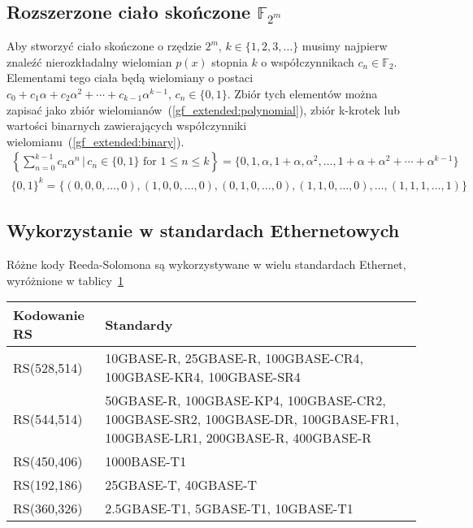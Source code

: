 \subsection{Rozszerzone ciało skończone $\mathbb{F}_{2^m}$}

Aby stworzyć ciało skończone o rzędzie $2^m$, $k \in \{ 1, 2, 3, \ldots \}$ musimy
najpierw znaleźć nierozkładalny wielomian $p(x)$ stopnia $k$ o współczynnikach
$c_{n} \in \mathbb{F}_{2}$.
Elementami tego ciała będą wielomiany o postaci $c_{0} + c_{1}\alpha + c_{2}\alpha^{2} +
    \cdots + c_{k-1}\alpha^{k-1}$, $c_{n} \in \{0, 1\}$.
Zbiór tych elementów można zapisać jako zbiór wielomianów~(\ref{gf_extended:polynomial}),
zbiór k-krotek lub wartości binarnych zawierających współczynniki
wielomianu~(\ref{gf_extended:binary}).
\begin{align}
    \left\{ \sum_{n=0}^{k-1} c_{n}\alpha^{n} \,|\, c_{n} \in \{0,1\} \text{ for } 1 \le n \le k \right\}
        = \{ 0, 1, \alpha, 1 + \alpha, \alpha^{2}, \ldots, 1 + \alpha + \alpha^2 + \cdots + \alpha^{k-1} \}
        \label{gf_extended:polynomial} \\
    \{ 0, 1 \}^{k} = \{ (0, 0, 0, \ldots, 0), (1, 0, 0, \ldots, 0), (0, 1, 0, \ldots, 0),
    (1, 1, 0, \ldots, 0), \ldots, (1, 1, 1, \ldots, 1) \} \label{gf_extended:binary}
\end{align}

\subsection{Wykorzystanie w standardach Ethernetowych}

Różne kody Reeda-Solomona są wykorzystywane w wielu standardach Ethernet,
wyróżnione w tablicy~\ref{standards:title}

\begingroup
{}
\begin{table}[h]
\label{standards:title}
\centering
    \begin{tabular}{m{3cm} m{9cm}}
    \toprule
    Kodowanie RS    & Standardy \\
    \midrule
    RS(528,514)     & 10GBASE-R, 25GBASE-R, 100GBASE-CR4, 100GBASE-KR4, 100GBASE-SR4 \\
    \midrule
    RS(544,514)     & 50GBASE-R, 100GBASE-KP4, 100GBASE-CR2, 100GBASE-SR2, 100GBASE-DR, 100GBASE-FR1, 100GBASE-LR1, \hfill 200GBASE-R, \hfill 400GBASE-R \\
    \midrule
    RS(450,406)     & 1000BASE-T1 \\
    \midrule
    RS(192,186)     & 25GBASE-T, \;\;\;\;\;\;\;\;\;\;\;\;\; 40GBASE-T \\
    \midrule
    RS(360,326)     & 2.5GBASE-T1, \hfill 5GBASE-T1, \hfill 10GBASE-T1 \\
    \bottomrule
    \end{tabular}
\end{table}
\endgroup

